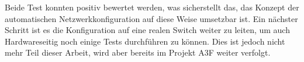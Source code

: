 Beide Test konnten positiv bewertet werden, was sicherstellt das, das Konzept der automatischen Netzwerkkonfiguration auf diese Weise umsetzbar ist. Ein nächster Schritt ist es die Konfiguration auf eine realen Switch weiter zu leiten, um auch Hardwareseitig noch einige Tests durchführen zu können. Dies ist jedoch nicht mehr Teil dieser Arbeit, wird aber bereits im Projekt A3F weiter verfolgt.